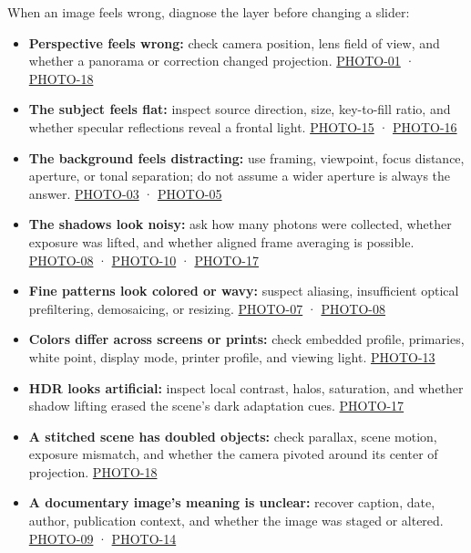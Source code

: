 When an image feels wrong, diagnose the layer before changing a slider:

\begin{itemize}
\tightlist
\item
  \textbf{Perspective feels wrong:} check camera position, lens field of view, and whether a panorama or correction changed projection. \hyperref[04-visual-computing-ii-ch036-photo-01---photography-session-01]{PHOTO-01} · \hyperref[04-visual-computing-ii-ch036-photo-18---photography-session-18]{PHOTO-18}
\item
  \textbf{The subject feels flat:} inspect source direction, size, key-to-fill ratio, and whether specular reflections reveal a frontal light. \hyperref[04-visual-computing-ii-ch036-photo-15---photography-session-15]{PHOTO-15} · \hyperref[04-visual-computing-ii-ch036-photo-16---photography-session-16]{PHOTO-16}
\item
  \textbf{The background feels distracting:} use framing, viewpoint, focus distance, aperture, or tonal separation; do not assume a wider aperture is always the answer. \hyperref[04-visual-computing-ii-ch036-photo-03---photography-session-03]{PHOTO-03} · \hyperref[04-visual-computing-ii-ch036-photo-05---photography-session-05]{PHOTO-05}
\item
  \textbf{The shadows look noisy:} ask how many photons were collected, whether exposure was lifted, and whether aligned frame averaging is possible. \hyperref[04-visual-computing-ii-ch036-photo-08---photography-session-08]{PHOTO-08} · \hyperref[04-visual-computing-ii-ch036-photo-10---photography-session-10]{PHOTO-10} · \hyperref[04-visual-computing-ii-ch036-photo-17---photography-session-17]{PHOTO-17}
\item
  \textbf{Fine patterns look colored or wavy:} suspect aliasing, insufficient optical prefiltering, demosaicing, or resizing. \hyperref[04-visual-computing-ii-ch036-photo-07---photography-session-07]{PHOTO-07} · \hyperref[04-visual-computing-ii-ch036-photo-08---photography-session-08]{PHOTO-08}
\item
  \textbf{Colors differ across screens or prints:} check embedded profile, primaries, white point, display mode, printer profile, and viewing light. \hyperref[04-visual-computing-ii-ch036-photo-13---photography-session-13]{PHOTO-13}
\item
  \textbf{HDR looks artificial:} inspect local contrast, halos, saturation, and whether shadow lifting erased the scene's dark adaptation cues. \hyperref[04-visual-computing-ii-ch036-photo-17---photography-session-17]{PHOTO-17}
\item
  \textbf{A stitched scene has doubled objects:} check parallax, scene motion, exposure mismatch, and whether the camera pivoted around its center of projection. \hyperref[04-visual-computing-ii-ch036-photo-18---photography-session-18]{PHOTO-18}
\item
  \textbf{A documentary image's meaning is unclear:} recover caption, date, author, publication context, and whether the image was staged or altered. \hyperref[04-visual-computing-ii-ch036-photo-09---photography-session-09]{PHOTO-09} · \hyperref[04-visual-computing-ii-ch036-photo-14---photography-session-14]{PHOTO-14}
\end{itemize}

